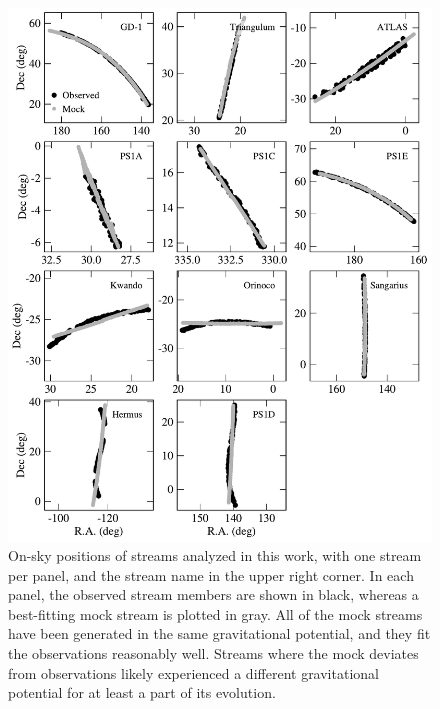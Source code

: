 \documentclass[modern]{aastex62}
\begin{document}
\begin{figure}
\begin{center}
\includegraphics[width=\textwidth]{mocks.pdf}
\caption{On-sky positions of streams analyzed in this work, with one stream per panel, and the stream name in the upper right corner.
In each panel, the observed stream members are shown in black, whereas a best-fitting mock stream is plotted in gray.
All of the mock streams have been generated in the same gravitational potential, and they fit the observations reasonably well.
Streams where the mock deviates from observations likely experienced a different gravitational potential for at least a part of its evolution.
}
\label{fig:gallery}
\end{center}
\end{figure}
\end{document}
